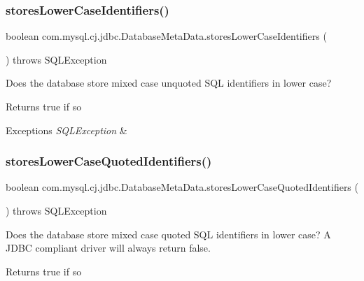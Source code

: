 \subsubsection{\texorpdfstring{stores\+Lower\+Case\+Identifiers()}{storesLowerCaseIdentifiers()}}
{\footnotesize\ttfamily boolean com.\+mysql.\+cj.\+jdbc.\+Database\+Meta\+Data.\+stores\+Lower\+Case\+Identifiers (\begin{DoxyParamCaption}{ }\end{DoxyParamCaption}) throws S\+Q\+L\+Exception}

Does the database store mixed case unquoted S\+QL identifiers in lower case?

\begin{DoxyReturn}{Returns}
true if so 
\end{DoxyReturn}

\begin{DoxyExceptions}{Exceptions}
{\em S\+Q\+L\+Exception} & \\
\hline
\end{DoxyExceptions}
\mbox{\label{classcom_1_1mysql_1_1cj_1_1jdbc_1_1_database_meta_data_a484be93eb5a6791992652b8d954afa78}} 
\subsubsection{\texorpdfstring{stores\+Lower\+Case\+Quoted\+Identifiers()}{storesLowerCaseQuotedIdentifiers()}}
{\footnotesize\ttfamily boolean com.\+mysql.\+cj.\+jdbc.\+Database\+Meta\+Data.\+stores\+Lower\+Case\+Quoted\+Identifiers (\begin{DoxyParamCaption}{ }\end{DoxyParamCaption}) throws S\+Q\+L\+Exception}

Does the database store mixed case quoted S\+QL identifiers in lower case? A J\+D\+BC compliant driver will always return false.

\begin{DoxyReturn}{Returns}
true if so 
\end{DoxyReturn}

